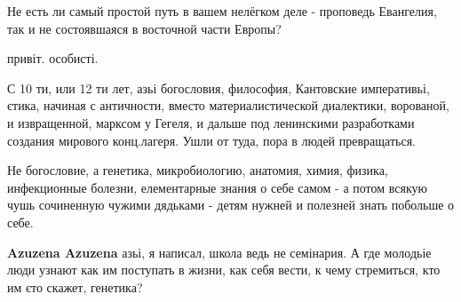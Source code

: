 \begin{itemize}
Не есть ли самый простой путь в вашем нелёгком деле - проповедь Евангелия, так
и не состоявшаяся в восточной части Европы?

 
привіт. особисті.

 

С 10 ти, или 12 ти лет, азьі богословия, философия, Кантовские императивьі,
єтика, начиная с античности, вместо материалистической диалектики, ворованой, и
извращенной, марксом у Гегеля, и дальше под ленинскими разработками создания
мирового конц.лагеря. Ушли от туда, пора в людей превращаться.

\begin{itemize}
 

Не богословие, а генетика, микробиологию, анатомия, химия, физика, инфекционные
болезни, елементарные знания о себе самом - а потом всякую чушь сочиненную
чужими дядьками - детям нужней и полезней знать побольше о себе.


 
\textbf{Azuzena Azuzena} азьі, я написал, школа ведь не семінария. А где
молодьіе люди узнают как им поступать в жизни, как себя вести, к чему
стремиться, кто им єто скажет, генетика?
\end{itemize}

 


\end{itemize}
